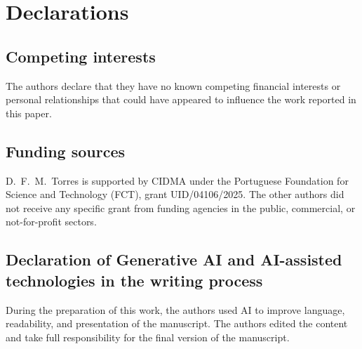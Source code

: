 \documentclass[11pt,a4paper]{article}
\numberwithin{equation}{section}
\theoremstyle{definition}
\begin{document}

\section*{Declarations}

\subsection*{Competing interests} The authors declare that they have no known competing financial interests or personal relationships that could have appeared to influence the work reported in this paper.

\subsection*{Funding sources}
D.~F.~M.~Torres is supported by CIDMA under the Portuguese Foundation for Science and Technology (FCT), grant UID/04106/2025. The other authors did not receive any specific grant from funding agencies in the public, commercial, or not-for-profit sectors.

\subsection*{Declaration of Generative AI and AI-assisted technologies in the writing process}
During the preparation of this work, the authors used AI to improve language, readability, and presentation of the manuscript. The authors edited the content and take full responsibility for the final version of the manuscript.

\end{document}
